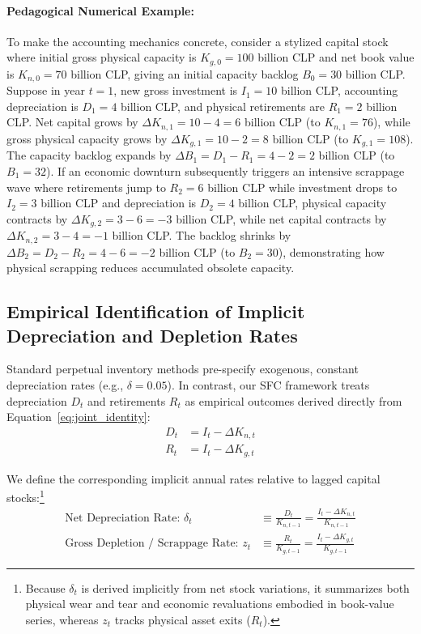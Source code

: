 \paragraph{Pedagogical Numerical Example:} To make the accounting mechanics concrete, consider a stylized capital stock where initial gross physical capacity is $K_{g,0} = 100$ billion CLP and net book value is $K_{n,0} = 70$ billion CLP, giving an initial capacity backlog $B_0 = 30$ billion CLP. Suppose in year $t=1$, new gross investment is $I_1 = 10$ billion CLP, accounting depreciation is $D_1 = 4$ billion CLP, and physical retirements are $R_1 = 2$ billion CLP. Net capital grows by $\Delta K_{n,1} = 10 - 4 = 6$ billion CLP (to $K_{n,1} = 76$), while gross physical capacity grows by $\Delta K_{g,1} = 10 - 2 = 8$ billion CLP (to $K_{g,1} = 108$). The capacity backlog expands by $\Delta B_1 = D_1 - R_1 = 4 - 2 = 2$ billion CLP (to $B_1 = 32$). If an economic downturn subsequently triggers an intensive scrappage wave where retirements jump to $R_2 = 6$ billion CLP while investment drops to $I_2 = 3$ billion CLP and depreciation is $D_2 = 4$ billion CLP, physical capacity contracts by $\Delta K_{g,2} = 3 - 6 = -3$ billion CLP, while net capital contracts by $\Delta K_{n,2} = 3 - 4 = -1$ billion CLP. The backlog shrinks by $\Delta B_2 = D_2 - R_2 = 4 - 6 = -2$ billion CLP (to $B_2 = 30$), demonstrating how physical scrapping reduces accumulated obsolete capacity.

\subsection{Empirical Identification of Implicit Depreciation and Depletion Rates}
Standard perpetual inventory methods pre-specify exogenous, constant depreciation rates (e.g., $\delta = 0.05$). In contrast, our SFC framework treats depreciation $D_t$ and retirements $R_t$ as empirical outcomes derived directly from Equation~\eqref{eq:joint_identity}:
\begin{align}
D_t &= I_t - \Delta K_{n,t} \label{eq:D_derived} \\
R_t &= I_t - \Delta K_{g,t} \label{eq:R_derived}
\end{align}

We define the corresponding implicit annual rates relative to lagged capital stocks:\footnote{Because $\delta_t$ is derived implicitly from net stock variations, it summarizes both physical wear and tear and economic revaluations embodied in book-value series, whereas $z_t$ tracks physical asset exits ($R_t$).}
\begin{align}
\text{Net Depreciation Rate: } \delta_t &\equiv \frac{D_t}{K_{n,t-1}} = \frac{I_t - \Delta K_{n,t}}{K_{n,t-1}} \label{eq:delta_rate} \\
\text{Gross Depletion / Scrappage Rate: } z_t &\equiv \frac{R_t}{K_{g,t-1}} = \frac{I_t - \Delta K_{g,t}}{K_{g,t-1}} \label{eq:z_rate}
\end{align}

